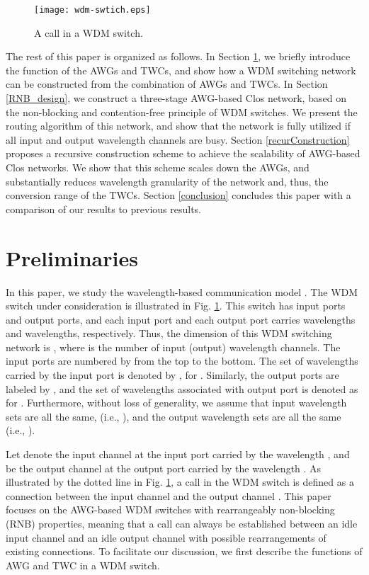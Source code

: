 \documentclass[journal]{IEEEtran}
\begin{document}
\begin{figure}[t]
\centering
\texttt{[image: wdm-swtich.eps]}
\caption{A call in a WDM switch.}\label{f_wdm-swtich}
\end{figure}

The rest of this paper is organized as follows. In Section
\ref{preliminary}, we briefly introduce the function of the AWGs and
TWCs, and show how a WDM switching network can be constructed from
the combination of AWGs and TWCs. In Section \ref{RNB_design}, we
construct a three-stage AWG-based Clos network, based on the
non-blocking and contention-free principle of WDM switches. We
present the routing algorithm of this network, and show that the
network is fully utilized if all input and output wavelength
channels are busy. Section \ref{recurConstruction} proposes a
recursive construction scheme to achieve the scalability of
AWG-based Clos networks. We show that this scheme scales down the
AWGs, and substantially reduces wavelength granularity of the
network and, thus, the conversion range of the TWCs. Section
\ref{conclusion} concludes this paper with a comparison of our
results to previous results.

\section{Preliminaries}\label{preliminary}
In this paper, we study the wavelength-based communication model
\cite{Pattavina:INFOCOM2006}. The WDM switch under consideration is
illustrated in Fig. \ref{f_wdm-swtich}. This switch has  input
ports and  output ports, and each input port and each output port
carries  wavelengths and  wavelengths, respectively. Thus, the
dimension of this WDM switching network is , where 
is the number of input (output) wavelength channels. The input ports
are numbered by  from the top to the bottom. The set
of wavelengths carried by the input port  is denoted by
, for . Similarly, the output
ports are labeled by , and the set of wavelengths
associated with output port  is denoted as 
for . Furthermore, without loss of generality,
we assume that input wavelength sets are all the same, (i.e.,
), and the output wavelength sets are all the
same (i.e., ).

Let  denote the input channel at the input port
 carried by the wavelength , and
 be the output channel at the output port 
carried by the wavelength . As illustrated by the
dotted line in Fig. \ref{f_wdm-swtich}, a call
 in the WDM switch is defined as a
connection between the input channel  and the
output channel . This paper focuses on the
AWG-based WDM switches with rearrangeably non-blocking (RNB)
properties, meaning that a call can always be established between an
idle input channel  and an idle output channel
 with possible rearrangements of existing
connections. To facilitate our discussion, we first describe the
functions of AWG and TWC in a WDM switch.
\end{document}
